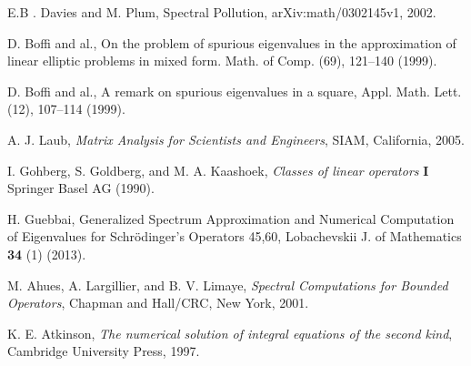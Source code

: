 \documentclass[
11pt,%
tightenlines,%
twoside,%
onecolumn,%
nofloats,%
nobibnotes,%
nofootinbib,%
superscriptaddress,%
noshowpacs,%
centertags]%
{revtex4}
\begin{document}
\begin{thebibliography}{20}

E.B . Davies and M. Plum, Spectral Pollution, arXiv:math/0302145v1,
2002.

D. Boffi and al., On the problem of spurious eigenvalues in the
approximation of linear elliptic problems in mixed form. Math. of
Comp. (69),  121--140 (1999).

D. Boffi and al., A remark on spurious eigenvalues in a square,
Appl. Math. Lett. (12),  107--114 (1999).

A. J. Laub, {\it Matrix Analysis for Scientists and Engineers}, SIAM, California, 2005.

I. Gohberg, S. Goldberg, and M. A. Kaashoek, {\it Classes  of linear
operators} {\bf I} Springer Basel AG (1990).

H. Guebbai, Generalized Spectrum Approximation and Numerical
Computation of  Eigenvalues for Schr\"{o}dinger's Operators 45,60,
Lobachevskii J. of Mathematics {\bf 34} (1) (2013).

M. Ahues, A. Largillier, and B. V. Limaye, {\it Spectral Computations for Bounded Operators}, Chapman and
Hall/CRC, New York, 2001.

K. E. Atkinson, {\it The numerical solution of integral equations of the second kind}, Cambridge University Press, 1997.

\end{thebibliography}
\end{document}
